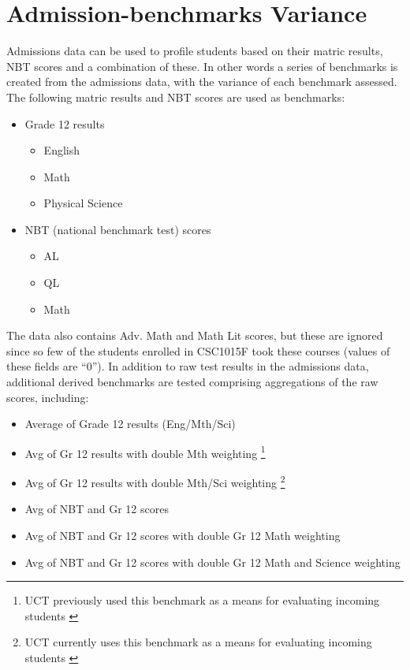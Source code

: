 \section{Admission-benchmarks Variance}
Admissions data can be used to profile students based on their matric results, NBT scores and a combination of these. In other words a series of benchmarks is created from the admissions data, with the variance of each benchmark assessed. The following matric results and NBT scores are used as benchmarks:

\begin{itemize}
  \item Grade 12 results
        \begin{itemize}
          \item English
          \item Math
          \item Physical Science
        \end{itemize}
  \item NBT (national benchmark test) scores
        \begin{itemize}
          \item AL
          \item QL
          \item Math
        \end{itemize}
\end{itemize}

The data also contains Adv. Math and Math Lit scores, but these are ignored since so few of the students enrolled in CSC1015F took these courses (values of these fields are ``0''). In addition to raw test results in the admissions data, additional derived benchmarks are tested comprising aggregations of the raw scores, including:

\begin{itemize}
  \item Average of Grade 12 results (Eng/Mth/Sci)
  \item Avg of Gr 12 results with double Mth weighting \footnote{UCT previously used this benchmark as a means for evaluating incoming students \cite{sonia2018}}
  \item Avg of Gr 12 results with double Mth/Sci weighting \footnote{UCT currently uses this benchmark as a means for evaluating incoming students \cite{sonia2018}}
  \item Avg of NBT and Gr 12 scores
  \item Avg of NBT and Gr 12 scores with double Gr 12 Math weighting
  \item Avg of NBT and Gr 12 scores with double Gr 12 Math and Science weighting
\end{itemize}

